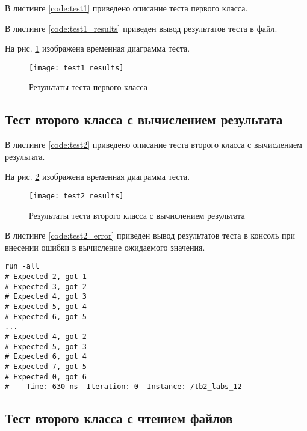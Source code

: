 В листинге \ref{code:test1} приведено описание теста первого класса.


В листинге \ref{code:test1_results} приведен вывод результатов теста в файл.


На рис. \ref{fig:test1_results} изображена временная диаграмма теста.
\begin{figure}[H]
	\begin{center}
		\texttt{[image: test1\_results]}
		\caption{Результаты теста первого класса}
		\label{fig:test1_results}
	\end{center}
\end{figure}

\subsection{Тест второго класса с вычислением результата}

В листинге \ref{code:test2} приведено описание теста второго класса с вычислением результата.


На рис. \ref{fig:test2_results} изображена временная диаграмма теста.
\begin{figure}[H]
	\begin{center}
		\texttt{[image: test2\_results]}
		\caption{Результаты теста второго класса с вычислением результата}
		\label{fig:test2_results}
	\end{center}
\end{figure}

В листинге \ref{code:test2_error} приведен вывод результатов теста в консоль при внесении ошибки в вычисление ожидаемого значения.	
\begin{lstlisting}[caption=Результаты ошибочного теста второго класса с вычислением результата, label=code:test2_error, style=console]
run -all
# Expected 2, got 1
# Expected 3, got 2
# Expected 4, got 3
# Expected 5, got 4
# Expected 6, got 5
...
# Expected 4, got 2
# Expected 5, got 3
# Expected 6, got 4
# Expected 7, got 5
# Expected 0, got 6
#    Time: 630 ns  Iteration: 0  Instance: /tb2_labs_12
\end{lstlisting}

\subsection{Тест второго класса с чтением файлов}


